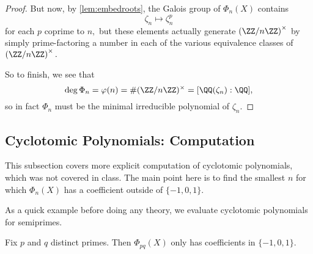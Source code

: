 \documentclass[../notes.tex]{subfiles}
\begin{document}
\begin{proof}
	But now, by \autoref{lem:embedroots}, the Galois group of $\Phi_n(X)$ contains
	\[\zeta_n\mapsto\zeta_n^p\]
	for each $p$ coprime to $n,$ but these elements actually generate $\left(\ZZ/n\ZZ\right)^\times$ by simply prime-factoring a number in each of the various equivalence classes of $\left(\ZZ/n\ZZ\right)^\times.$

	So to finish, we see that
	\[\deg\Phi_n=\varphi(n)=\#(\ZZ/n\ZZ)^\times=[\QQ(\zeta_n):\QQ],\]
	so in fact $\Phi_n$ must be the minimal irreducible polynomial of $\zeta_n.$
\end{proof}

\subsection{Cyclotomic Polynomials: Computation}
\begin{warn}
	This subsection covers more explicit computation of cyclotomic polynomials, which was not covered in class. The main point here is to find the smallest $n$ for which $\Phi_n(X)$ has a coefficient outside of $\{-1,0,1\}.$
\end{warn}
As a quick example before doing any theory, we evaluate cyclotomic polynomials for semiprimes.
\begin{exe}
	Fix $p$ and $q$ distinct primes. Then $\Phi_{pq}(X)$ only has coefficients in $\{-1,0,1\}.$
\end{exe}
\end{document}
